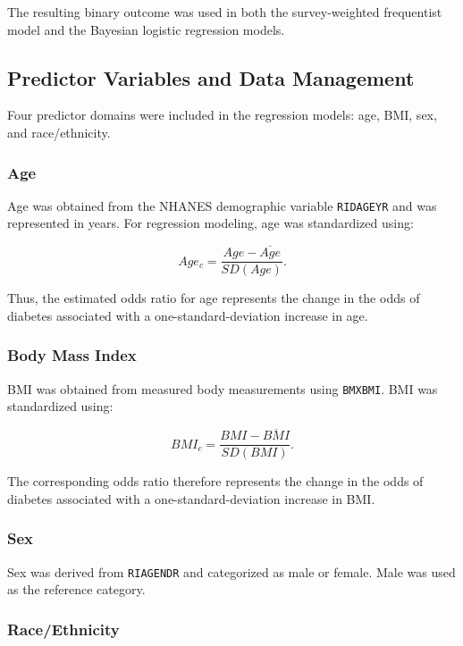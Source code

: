 \documentclass[12pt]{article}
\begin{document}
The resulting binary outcome was used in both the survey-weighted frequentist model and the Bayesian logistic regression models.


\subsection{Predictor Variables and Data Management}

Four predictor domains were included in the regression models: age, BMI, sex, and race/ethnicity.

\subsubsection{Age}

Age was obtained from the NHANES demographic variable \texttt{RIDAGEYR} and was represented in years. For regression modeling, age was standardized using:

\[
Age_c =
\frac{Age-\overline{Age}}
{SD(Age)}.
\]

Thus, the estimated odds ratio for age represents the change in the odds of diabetes associated with a one-standard-deviation increase in age.

\subsubsection{Body Mass Index}

BMI was obtained from measured body measurements using \texttt{BMXBMI}. BMI was standardized using:

\[
BMI_c =
\frac{BMI-\overline{BMI}}
{SD(BMI)}.
\]

The corresponding odds ratio therefore represents the change in the odds of diabetes associated with a one-standard-deviation increase in BMI.

\subsubsection{Sex}

Sex was derived from \texttt{RIAGENDR} and categorized as male or female. Male was used as the reference category.

\subsubsection{Race/Ethnicity}
\end{document}
